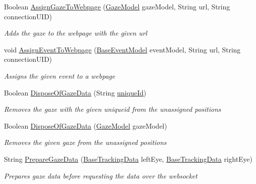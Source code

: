 \begin{DoxyCompactItemize}
Boolean \hyperlink{class_web_analyzer_1_1_models_1_1_data_model_1_1_test_model_adc538734c53c98df870c6cfee0fa6fb3}{Assign\+Gaze\+To\+Webpage} (\hyperlink{class_web_analyzer_1_1_models_1_1_data_model_1_1_gaze_model}{Gaze\+Model} gaze\+Model, String url, String connection\+U\+I\+D)
\begin{DoxyCompactList}\small\item\em Adds the gaze to the webpage with the given url \end{DoxyCompactList}\item 
void \hyperlink{class_web_analyzer_1_1_models_1_1_data_model_1_1_test_model_ad533cefe778bc7d604862cf9efeb70b1}{Assign\+Event\+To\+Webpage} (\hyperlink{class_web_analyzer_1_1_models_1_1_event_model_1_1_base_event_model}{Base\+Event\+Model} event\+Model, String url, String connection\+U\+I\+D)
\begin{DoxyCompactList}\small\item\em Assigns the given event to a webpage \end{DoxyCompactList}\item 
Boolean \hyperlink{class_web_analyzer_1_1_models_1_1_data_model_1_1_test_model_a4e84c40eeb26adae1fcacc4ffc291d2f}{Dispose\+Of\+Gaze\+Data} (String \hyperlink{_u_i_2_h_t_m_l_resources_2js_2lib_2underscore_8min_8js_af690ff5521d79c7128861033ae80ae17}{unique\+Id})
\begin{DoxyCompactList}\small\item\em Removes the gaze with the given uniqueid from the unassigned positions \end{DoxyCompactList}\item 
Boolean \hyperlink{class_web_analyzer_1_1_models_1_1_data_model_1_1_test_model_a5f84a8ffb744cbe5dc345e1f34bff9a6}{Dispose\+Of\+Gaze\+Data} (\hyperlink{class_web_analyzer_1_1_models_1_1_data_model_1_1_gaze_model}{Gaze\+Model} gaze\+Model)
\begin{DoxyCompactList}\small\item\em Removes the given gaze from the unassigned positions \end{DoxyCompactList}\item 
String \hyperlink{class_web_analyzer_1_1_models_1_1_data_model_1_1_test_model_a3557a6cfa17577cb62c9e711cff1625e}{Prepare\+Gaze\+Data} (\hyperlink{class_web_analyzer_1_1_models_1_1_base_1_1_base_tracking_data}{Base\+Tracking\+Data} left\+Eye, \hyperlink{class_web_analyzer_1_1_models_1_1_base_1_1_base_tracking_data}{Base\+Tracking\+Data} right\+Eye)
\begin{DoxyCompactList}\small\item\em Prepares gaze data before requesting the data over the websocket \end{DoxyCompactList}\item 

\end{DoxyCompactItemize}

